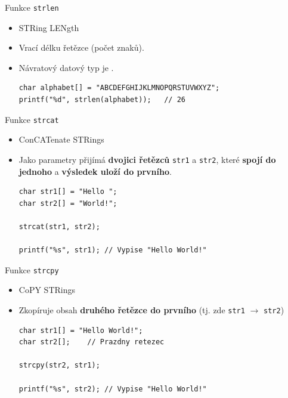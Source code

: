 \documentclass[14pt,aspectratio=169]{beamer}
\begin{document}
    \begin{frame}[t,fragile]{Funkce \texttt{strlen}}
        \begin{itemize}
            \item STRing LENgth
            \item Vrací délku řetězce (počet znaků).
            \item Návratový datový typ je .
            \begin{lstlisting}
char alphabet[] = "ABCDEFGHIJKLMNOPQRSTUVWXYZ";
printf("%d", strlen(alphabet));   // 26
            \end{lstlisting}
        \end{itemize}
    \end{frame}

    \begin{frame}[t,fragile]{Funkce \texttt{strcat}}
        \begin{itemize}
            \item ConCATenate STRings
            \item Jako parametry přijímá \textbf{dvojici řetězců} \texttt{str1} a \texttt{str2}, které \textbf{spojí do jednoho} a \textbf{výsledek uloží do prvního}.
            \begin{lstlisting}
char str1[] = "Hello ";
char str2[] = "World!";

strcat(str1, str2);

printf("%s", str1); // Vypise "Hello World!"
            \end{lstlisting}
        \end{itemize}
    \end{frame}

    \begin{frame}[t,fragile]{Funkce \texttt{strcpy}}
        \begin{itemize}
            \item CoPY STRings
            \item Zkopíruje obsah \textbf{druhého řetězce do prvního} (tj. zde \texttt{str1} $\rightarrow$ \texttt{str2})
            \begin{lstlisting}
char str1[] = "Hello World!";
char str2[];    // Prazdny retezec

strcpy(str2, str1);

printf("%s", str2); // Vypise "Hello World!"
            \end{lstlisting}
        \end{itemize}
    \end{frame}
\end{document}
